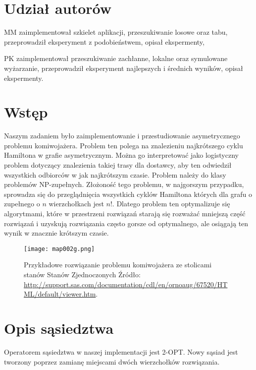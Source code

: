 \documentclass{article}
\begin{document}


\section*{Udział autorów}
\begin{tightlist}
\item MM zaimplementował szkielet aplikacji, przeszukiwanie losowe oraz tabu, przeprowadził eksperyment z podobieństwem, opisał ekspermenty,
\item PK zaimplementował przeszukiwanie zachłanne, lokalne oraz symulowane wyżarzanie, przeprowadził eksperyment najlepszych i średnich wyników, opisał ekspermenty.
\end{tightlist}


\section{Wstęp}

Naszym zadaniem było zaimplementowanie i przestudiowanie asymetrycznego problemu komiwojażera. Problem ten polega na znalezieniu najkrótszego cyklu Hamiltona w grafie asymetrycznym. Można go interpretować jako logistyczny problem dotyczący znalezienia takiej trasy dla dostawcy, aby ten odwiedził wszystkich odbiorców w jak najkrótszym czasie. Problem należy do klasy problemów NP-zupełnych. Złożoność tego problemu, w najgorszym przypadku, sprowadza się do przeglądnięcia wszystkich cyklów Hamiltona których dla grafu o zupełnego o $n$ wierzchołkach jest $n!$. Dlatego problem ten optymalizuje się algorytmami, które w przestrzeni rozwiązań starają się rozważać mniejszą część rozwiązań i uzyskują rozwiązania często gorsze od optymalnego, ale osiągają ten wynik w znacznie krótszym czasie.

\begin{figure}[H]
\begin{center}
    \texttt{[image: map002g.png]}
\end{center}
\caption{Przykładowe rozwiązanie problemu komiwojażera ze stolicami stanów Stanów Zjednoczonych Źródło: \url{http://support.sas.com/documentation/cdl/en/ornoaug/67520/HTML/default/viewer.htm}.}
\label{fig:schemat}
\end{figure}


\section{Opis sąsiedztwa}

Operatorem sąsiedztwa w naszej implementacji jest 2-OPT. Nowy sąsiad jest tworzony poprzez zamianę miejscami dwóch wierzchołków rozwiązania. 
\end{document}
